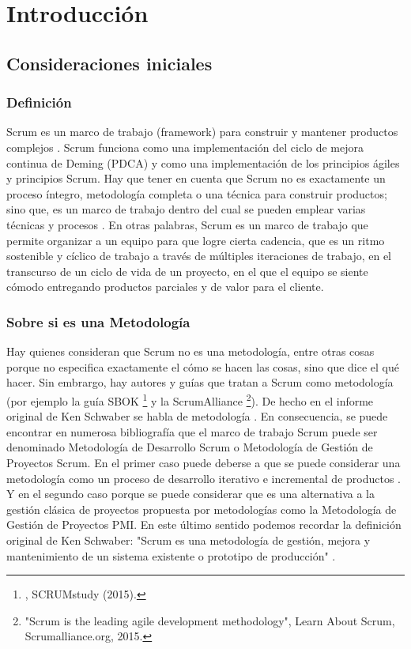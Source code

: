 \chapter{Introducción}

\section{Consideraciones iniciales}

\subsection{Definición}

Scrum es un marco de trabajo (framework) para construir y mantener productos complejos \cite{SBOK-2013} \cite{Scrum-Alliance-2015}. 
Scrum funciona como una implementación del ciclo de mejora continua de Deming (PDCA) y como una implementación de los principios ágiles y principios Scrum. Hay que tener en cuenta que Scrum no es exactamente un proceso íntegro, metodología completa o una técnica para construir productos; sino que, es un marco de trabajo dentro del cual se pueden emplear varias técnicas y procesos \cite{Agile-Atlas-2012}. En otras palabras, Scrum es un marco de trabajo que permite organizar a un equipo para que logre cierta cadencia, que es un ritmo sostenible y cíclico de trabajo a través de múltiples iteraciones de trabajo, en el transcurso de un ciclo de vida de un proyecto, en el que el equipo se siente cómodo entregando productos parciales y de valor para el cliente.

\subsection{Sobre si es una Metodología}

Hay quienes consideran que Scrum no es una metodología, entre otras cosas porque no especifica exactamente el cómo se hacen las cosas, 
sino que dice el qué hacer. Sin embrargo, hay autores y guías que tratan a Scrum como metodología (por ejemplo la guía SBOK \footnote{\cite{SBOK-2013}, SCRUMstudy (2015).} y la ScrumAlliance \footnote{"Scrum is the leading agile development methodology", Learn About Scrum, Scrumalliance.org, 2015.}). De hecho en el informe original de Ken Schwaber se habla de metodología \cite{Ken-Schwaber-1995}. En consecuencia, se puede encontrar en numerosa bibliografía que el marco de trabajo Scrum puede ser denominado Metodología de Desarrollo Scrum o Metodología de Gestión de Proyectos Scrum. 
En el primer caso puede deberse a que se puede considerar una metodología como un proceso de desarrollo iterativo e incremental de productos \cite{Ken-Schwaber-1995}. Y en el segundo caso porque se puede considerar que es una alternativa a la gestión clásica de proyectos propuesta por metodologías como la Metodología de Gestión de Proyectos PMI. En este último sentido podemos recordar la definición original de Ken Schwaber: "Scrum es una metodología de gestión, mejora y mantenimiento de un sistema existente o prototipo de producción" \cite{Ken-Schwaber-1995}.
 
